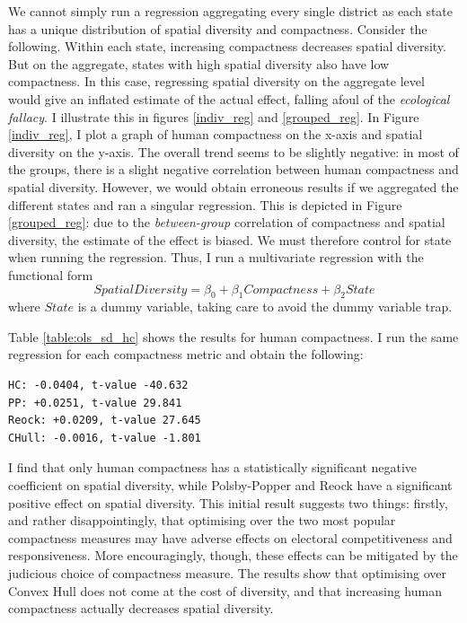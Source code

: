 \documentclass[]{article}
\begin{document}
We cannot simply run a regression aggregating every single district as
each state has a unique distribution of spatial diversity and
compactness. Consider the following. Within each state, increasing
compactness decreases spatial diversity. But on the aggregate, states
with high spatial diversity also have low compactness. In this case,
regressing spatial diversity on the aggregate level would give an
inflated estimate of the actual effect, falling afoul of the
\emph{ecological fallacy}. I illustrate this in figures \ref{indiv_reg}
and \ref{grouped_reg}. In Figure \ref{indiv_reg}, I plot a graph of
human compactness on the x-axis and spatial diversity on the y-axis. The
overall trend seems to be slightly negative: in most of the groups,
there is a slight negative correlation between human compactness and
spatial diversity. However, we would obtain erroneous results if we
aggregated the different states and ran a singular regression. This is
depicted in Figure \ref{grouped_reg}: due to the \emph{between-group}
correlation of compactness and spatial diversity, the estimate of the
effect is biased. We must therefore control for state when running the
regression. Thus, I run a multivariate regression with the functional
form \[SpatialDiversity = \beta_0 + \beta_1
Compactness + \beta_2 State\] where \(State\) is a dummy variable,
taking care to avoid the dummy variable trap.

Table \ref{table:ols_sd_hc} shows the results for human compactness. I
run the same regression for each compactness metric and obtain the
following:

\begin{verbatim}
HC: -0.0404, t-value -40.632
PP: +0.0251, t-value 29.841
Reock: +0.0209, t-value 27.645
CHull: -0.0016, t-value -1.801
\end{verbatim}

I find that only human compactness has a statistically significant
negative coefficient on spatial diversity, while Polsby-Popper and Reock
have a significant positive effect on spatial diversity. This initial
result suggests two things: firstly, and rather disappointingly, that
optimising over the two most popular compactness measures may have
adverse effects on electoral competitiveness and responsiveness. More
encouragingly, though, these effects can be mitigated by the judicious
choice of compactness measure. The results show that optimising over
Convex Hull does not come at the cost of diversity, and that increasing
human compactness actually decreases spatial diversity.
\end{document}
